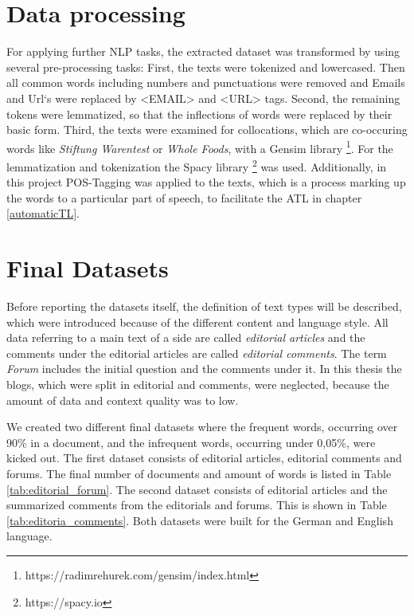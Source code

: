 \section{Data processing}
\label{data:preprocessing}
For applying further \ac{NLP} tasks, the extracted dataset was transformed by using several pre-processing tasks: First, the texts were tokenized and lowercased. Then all common words including numbers and punctuations were removed and Emails and Url`s were replaced by <EMAIL> and <URL> tags. Second, the remaining tokens were lemmatized, so that the inflections of words were replaced by their basic form. Third, the texts were examined for collocations, which are co-occuring words like \textit{Stiftung Warentest} or \textit{Whole Foods},  with a Gensim library \footnote{https://radimrehurek.com/gensim/index.html}. For the lemmatization and tokenization the Spacy library \footnote{https://spacy.io} was used.
Additionally, in this project \ac{POS}-Tagging was applied to the texts, which is a process marking up the words to a particular part of speech, to facilitate the \ac{ATL} in chapter \ref{automaticTL}. 

\section{Final Datasets}
Before reporting the datasets itself, the definition of text types will be described, which were introduced because of the different content and language style. 
All data referring to a main text of a side are called \textit{editorial articles} and the comments under the editorial articles are called \textit{editorial comments}. The term \textit{Forum} includes the initial question and the comments under it.
In this thesis the blogs, which were split in editorial and comments, were neglected, because the amount of data and context quality was to low.

We created two different final datasets where the frequent words, occurring over 90\% in a document, and the infrequent words, occurring under 0,05\%, were kicked out.
The first dataset \label{chris:daten} consists of editorial articles, editorial comments and forums. The final number of documents and amount of words is listed in Table \ref{tab:editorial_forum}. The second dataset consists of editorial articles and the summarized comments from the editorials and forums. This is shown in Table \ref{tab:editoria_comments}. Both datasets were built for the German and English language. 

